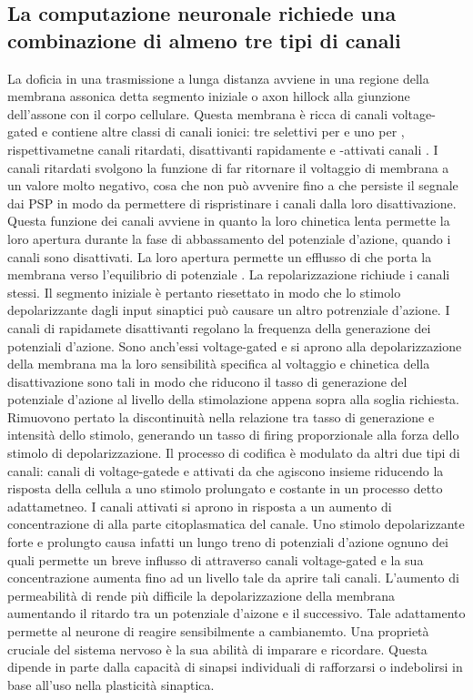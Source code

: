 \subsection{La computazione neuronale richiede una combinazione di almeno tre tipi di canali }
La doficia in una trasmissione a lunga distanza avviene in una regione della membrana assonica detta segmento iniziale o axon hillock alla giunzione dell'assone con il corpo cellulare.
Questa membrana \`e ricca di canali  voltage-gated e contiene altre classi di canali ionici: tre selettivi per  e uno per , rispettivametne canali 
ritardati, disattivanti rapidamente e -attivati canali . I canali  ritardati svolgono la funzione di far ritornare il voltaggio di membrana a un valore molto
negativo, cosa che non pu\`o avvenire fino a che persiste il segnale dai PSP in modo da permettere di rispristinare i canali  dalla loro disattivazione. Questa funzione dei
canali  avviene in quanto la loro chinetica lenta  permette la loro apertura durante la fase di abbassamento del potenziale d'azione, quando i canali  sono disattivati. 
La loro apertura permette un efflusso di  che porta la membrana verso l'equilibrio di potenziale . La repolarizzazione richiude i canali stessi. Il segmento iniziale \`e
pertanto riesettato in modo che lo stimolo depolarizzante dagli input sinaptici pu\`o causare un altro potrenziale d'azione. I canali di  rapidamete disattivanti regolano la
frequenza della generazione dei potenziali d'azione. Sono anch'essi voltage-gated e si aprono alla depolarizzazione della membrana ma la loro sensibilit\`a specifica al voltaggio
e chinetica della disattivazione sono tali in modo che riducono il tasso di generazione del potenziale d'azione al livello della stimolazione appena sopra alla soglia richiesta. 
Rimuovono pertato la discontinuit\`a nella relazione tra tasso di generazione e intensit\`a dello stimolo, generando un tasso di firing proporzionale alla forza dello stimolo di 
depolarizzazione. Il processo di codifica \`e modulato da altri due tipi di canali: canali di  voltage-gatede e attivati da  che agiscono insieme 
riducendo la risposta della cellula a uno stimolo prolungato e costante in un processo detto adattametneo. I canali  attivati si aprono in risposta a un aumento di 
concentrazione di  alla parte citoplasmatica del canale. Uno stimolo depolarizzante forte e prolungto causa infatti un lungo treno di potenziali d'azione ognuno dei quali
permette un breve influsso di  attraverso canali voltage-gated e la sua concentrazione aumenta fino ad un livello tale da aprire tali canali. L'aumento di permeabilit\`a 
di  rende pi\`u difficile la depolarizzazione della membrana aumentando il ritardo tra un potenziale d'aizone e il successivo. Tale adattamento permette al neurone di reagire
sensibilmente a cambianemto. Una propriet\`a cruciale del sistema nervoso \`e la sua abilit\`a di imparare e ricordare. Questa dipende in parte dalla capacit\`a di sinapsi individuali
di rafforzarsi o indebolirsi in base all'uso nella plasticit\`a sinaptica. 
